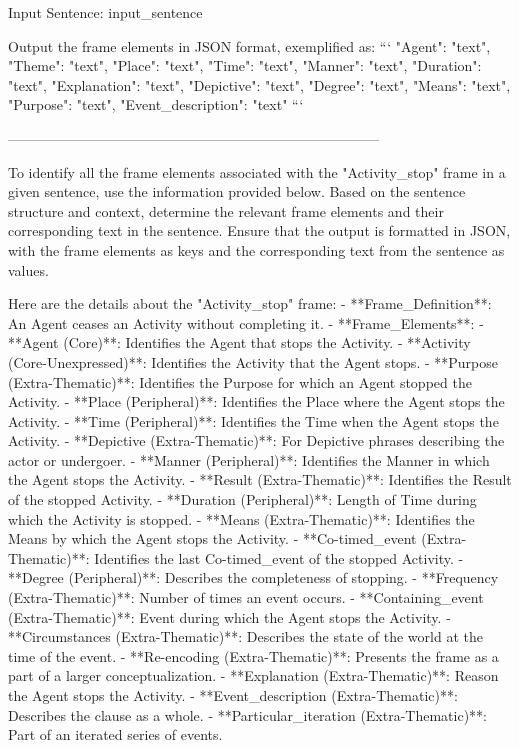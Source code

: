Input Sentence: {input_sentence}

Output the frame elements in JSON format, exemplified as:
```
{
    "Agent": "text",
    "Theme": "text",
    "Place": "text",
    "Time": "text",
    "Manner": "text",
    "Duration": "text",
    "Explanation": "text",
    "Depictive": "text",
    "Degree": "text",
    "Means": "text",
    "Purpose": "text",
    "Event_description": "text"
}
```


--------------------------------------------------------------------------------

To identify all the frame elements associated with the "Activity_stop" frame in a given sentence, use the information provided below. Based on the sentence structure and context, determine the relevant frame elements and their corresponding text in the sentence. Ensure that the output is formatted in JSON, with the frame elements as keys and the corresponding text from the sentence as values.

Here are the details about the "Activity_stop" frame:
- **Frame_Definition**: An Agent ceases an Activity without completing it.
- **Frame_Elements**:
  - **Agent (Core)**: Identifies the Agent that stops the Activity.
  - **Activity (Core-Unexpressed)**: Identifies the Activity that the Agent stops.
  - **Purpose (Extra-Thematic)**: Identifies the Purpose for which an Agent stopped the Activity.
  - **Place (Peripheral)**: Identifies the Place where the Agent stops the Activity.
  - **Time (Peripheral)**: Identifies the Time when the Agent stops the Activity.
  - **Depictive (Extra-Thematic)**: For Depictive phrases describing the actor or undergoer.
  - **Manner (Peripheral)**: Identifies the Manner in which the Agent stops the Activity.
  - **Result (Extra-Thematic)**: Identifies the Result of the stopped Activity.
  - **Duration (Peripheral)**: Length of Time during which the Activity is stopped.
  - **Means (Extra-Thematic)**: Identifies the Means by which the Agent stops the Activity.
  - **Co-timed_event (Extra-Thematic)**: Identifies the last Co-timed_event of the stopped Activity.
  - **Degree (Peripheral)**: Describes the completeness of stopping.
  - **Frequency (Extra-Thematic)**: Number of times an event occurs. 
  - **Containing_event (Extra-Thematic)**: Event during which the Agent stops the Activity.
  - **Circumstances (Extra-Thematic)**: Describes the state of the world at the time of the event.
  - **Re-encoding (Extra-Thematic)**: Presents the frame as a part of a larger conceptualization.
  - **Explanation (Extra-Thematic)**: Reason the Agent stops the Activity.
  - **Event_description (Extra-Thematic)**: Describes the clause as a whole.
  - **Particular_iteration (Extra-Thematic)**: Part of an iterated series of events.

